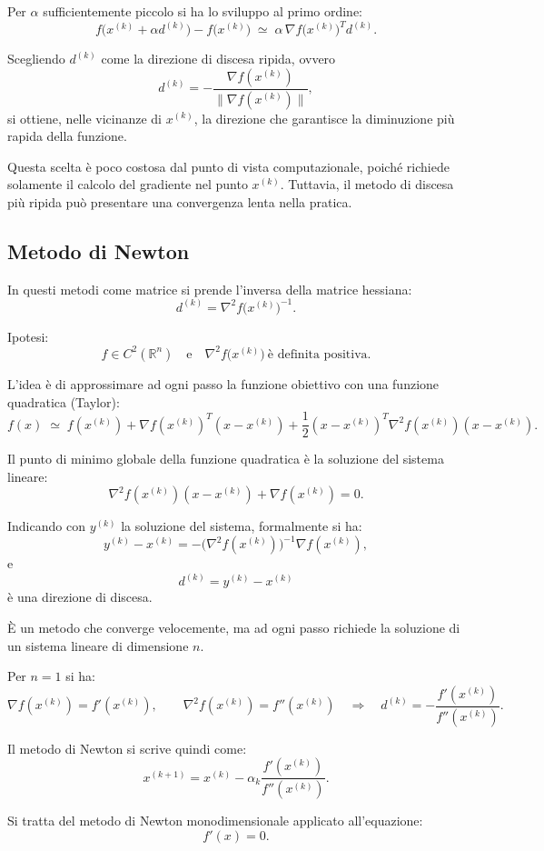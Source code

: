 Per $\alpha$ sufficientemente piccolo si ha lo sviluppo al primo ordine:
\[
f\bigl(x^{(k)} + \alpha d^{(k)}\bigr) - f\bigl(x^{(k)}\bigr)
\;\simeq\;
\alpha\, \nabla f\bigl(x^{(k)}\bigr)^T d^{(k)}.
\]

Scegliendo $d^{(k)}$ come la direzione di discesa ripida, ovvero
\[
d^{(k)} = -\frac{\nabla f(x^{(k)})}{\|\nabla f(x^{(k)})\|},
\]
si ottiene, nelle vicinanze di $x^{(k)}$, la direzione che garantisce
la diminuzione più rapida della funzione.

Questa scelta è poco costosa dal punto di vista computazionale,
poiché richiede solamente il calcolo del gradiente nel punto $x^{(k)}$.
Tuttavia, il metodo di discesa più ripida può presentare una
convergenza lenta nella pratica.

\subsection{Metodo di Newton}
In questi metodi come matrice si prende l'inversa della matrice hessiana:
\[
d^{(k)} =  \nabla^2 f\bigl(x^{(k)}\bigr)^{-1} .
\]

\noindent
Ipotesi:
\[
f \in C^2(\mathbb{R}^n)
\quad \text{e} \quad
\nabla^2 f\bigl(x^{(k)}\bigr) \ \text{è definita positiva.}
\]

L'idea è di approssimare ad ogni passo la funzione obiettivo con una funzione quadratica (Taylor):
\[
f(x) \;\simeq\; f(x^{(k)}) + \nabla f(x^{(k)})^T (x - x^{(k)}) 
+ \frac{1}{2} (x - x^{(k)})^T \nabla^2 f(x^{(k)})(x - x^{(k)}).
\]

Il punto di minimo globale della funzione quadratica è la soluzione del sistema lineare:
\[
\nabla^2 f(x^{(k)})(x - x^{(k)}) + \nabla f(x^{(k)}) = 0.
\]

Indicando con $y^{(k)}$ la soluzione del sistema, formalmente si ha:
\[
y^{(k)} - x^{(k)} = - \bigl( \nabla^2 f(x^{(k)}) \bigr)^{-1} \nabla f(x^{(k)}),
\]
e
\[
d^{(k)} = y^{(k)} - x^{(k)}
\]
è una direzione di discesa.

È un metodo che converge velocemente, ma ad ogni passo richiede la soluzione di un sistema lineare di dimensione $n$.
\begin{infobox}[Esempio con n=1]
    Per $n = 1$ si ha:
    \[
    \nabla f(x^{(k)}) = f'(x^{(k)}), \qquad 
    \nabla^2 f(x^{(k)}) = f''(x^{(k)}) \quad \Rightarrow \quad 
    d^{(k)} = - \frac{f'(x^{(k)})}{f''(x^{(k)})}.
    \]
    
    Il metodo di Newton si scrive quindi come:
    \[
    x^{(k+1)} = x^{(k)} - \alpha_k \frac{f'(x^{(k)})}{f''(x^{(k)})}.
    \]
    
    Si tratta del metodo di Newton monodimensionale applicato all'equazione:
    \[
    f'(x) = 0.
    \]
\end{infobox}

